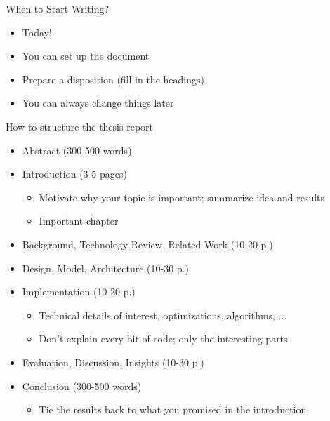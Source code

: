 \documentclass[hyperref={pdfpagelabels=false}, aspectratio=1610]{beamer}
\begin{document}
\begin{frame}
\begin{block}{When to Start Writing?}
 \begin{itemize}
  \item<2-> Today!
  \item<2-> You can set up the document 
  \item<2-> Prepare a disposition (fill in the headings)
  \item<2-> You can always change things later
 \end{itemize}
\end{block}
\end{frame}

\begin{frame}
\begin{block}{How to structure the thesis report}
 \begin{itemize}
  \item Abstract (300-500 words)
  \item Introduction (3-5 pages)
  \begin{itemize}
  	\item Motivate why your topic is important; summarize idea and results
	\item Important chapter
  \end{itemize}
  \item Background, Technology Review, Related Work (10-20 p.)
  \item Design, Model, Architecture (10-30 p.)
  \item Implementation (10-20 p.)
  \begin{itemize}
   \item Technical details of interest, optimizations, algorithms, ...
   \item Don't explain every bit of code; only the interesting parts
  \end{itemize}
  \item Evaluation, Discussion, Insights (10-30 p.)
  \item Conclusion (300-500 words)
  \begin{itemize}
  	\item Tie the results back to what you promised in the introduction
  \end{itemize}
 \end{itemize}
\end{block}
\end{frame}
\end{document}
